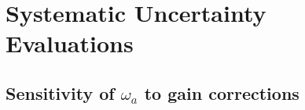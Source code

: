 \chapter{Systematic Uncertainty Evaluations}

\section{Sensitivity of \texorpdfstring{$\omega_{a}$}{} to gain corrections}
